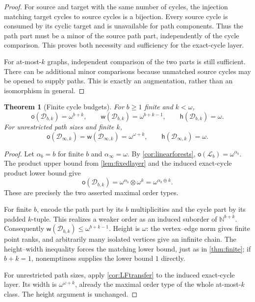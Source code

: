 \documentclass[11pt,letterpaper]{article}
\theoremstyle{plain}
\newtheorem{theorem}{Theorem}[section]
\theoremstyle{definition}
\theoremstyle{remark}
\newcommand{\N}{\mathbb N}
\newcommand{\mot}{\mathsf o}
\newcommand{\wid}{\mathsf w}
\newcommand{\hei}{\mathsf h}
\newcommand{\LF}{\mathcal L}
\newcommand{\DG}{\mathcal D}
\newcommand{\Inf}{\infty}
\begin{document}
\begin{proof}
For source and target with the same number of cycles, the injection
matching target cycles to source cycles is a bijection. Every source
cycle is consumed by its cyclic target and is unavailable for path
components. Thus the path part must be a minor of the source path
part, independently of the cycle comparison. This proves both
necessity and sufficiency for the exact-cycle layer.

For at-most-$k$ graphs, independent comparison of the two parts is
still sufficient. There can be additional minor comparisons because
unmatched source cycles may be opened to supply paths. This is
exactly an augmentation, rather than an isomorphism in general.
\end{proof}

\begin{theorem}[Finite cycle budgets]\label{thm:finitebudget}
For $b\ge1$ finite and $k<\omega$,
\[
 \mot(\DG_{b,k})=\omega^{b+k},\qquad
 \wid(\DG_{b,k})=\omega^{b+k-1},\qquad
 \hei(\DG_{b,k})=\omega.
\]
For unrestricted path sizes and finite $k$,
\[
 \mot(\DG_{\Inf,k})=\wid(\DG_{\Inf,k})=\omega^{\omega+k},
 \qquad \hei(\DG_{\Inf,k})=\omega.
\]
\end{theorem}

\begin{proof}
Let $\alpha_b=b$ for finite $b$ and $\alpha_{\Inf}=\omega$.
By \cref{cor:linearforests}, $\mot(\LF_b)=\omega^{\alpha_b}$.
The product upper bound from \cref{lem:fixedlayer} and the induced
exact-cycle product lower bound give
\[
 \mot(\DG_{b,k})
 =\omega^{\alpha_b}\otimes\omega^k
 =\omega^{\alpha_b\oplus k}.
\]
These are precisely the two asserted maximal order types.

For finite $b$, encode the path part by its $b$ multiplicities and
the cycle part by its padded $k$-tuple. This realizes a weaker order
as an induced suborder of $\N^{b+k}$. Consequently
$\wid(\DG_{b,k})\le\omega^{b+k-1}$. Height is $\omega$: the
vertex--edge norm gives finite point ranks, and arbitrarily many
isolated vertices give an infinite chain. The height--width
inequality forces the matching lower bound, just as in
\cref{thm:finite}; if $b+k=1$, nonemptiness supplies the lower bound
$1$ directly.

For unrestricted path sizes, apply \cref{cor:LFtransfer} to the
induced exact-cycle layer. Its width is $\omega^{\omega+k}$, already
the maximal order type of the whole at-most-$k$ class. The height
argument is unchanged.
\end{proof}
\end{document}
